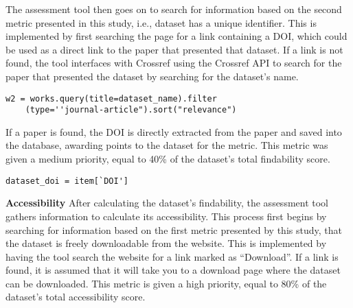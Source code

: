 \documentclass{cisfyp}
\begin{document}
The assessment tool then goes on to search for information based on the second metric presented in this study, i.e., dataset has a unique identifier. This is implemented by first searching the page for a link containing a DOI, which could be used as a direct link to the paper that presented that dataset. If a link is not found, the tool interfaces with Crossref using the Crossref API to search for the paper that presented the dataset by searching for the dataset's name.
\begin{lstlisting}[frame = single, caption={Searching Crossref API for paper presenting the dataset.}, captionpos=b]
w2 = works.query(title=dataset_name).filter
	(type=''journal-article").sort("relevance")
\end{lstlisting}
If a paper is found, the DOI is directly extracted from the paper and saved into the database, awarding points to the dataset for the metric. This metric was given a medium priority, equal to 40\% of the dataset's total findability score.
\begin{lstlisting}[frame = single, caption={Extracting DOI from paper.}, captionpos=b]
dataset_doi = item[`DOI']
\end{lstlisting}
\textbf{Accessibility}\newline
After calculating the dataset's findability, the assessment tool gathers information to calculate its accessibility. This process first begins by searching for information based on the first metric presented by this study, that the dataset is freely downloadable from the website. This is implemented by having the tool search the website for a link marked as ``Download''. If a link is found, it is assumed that it will take you to a download page where the dataset can be downloaded. This metric is given a high priority, equal to 80\% of the dataset's total accessibility score.
\end{document}
